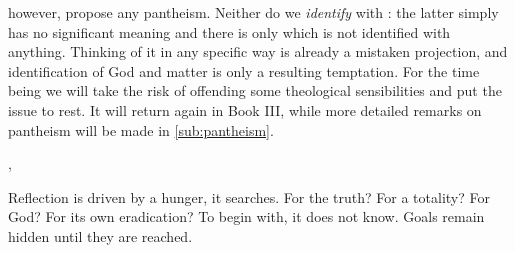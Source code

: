 however, propose any pantheism. Neither do we {\em identify}  with
: the latter simply has no significant meaning and there is only
 which is not identified with anything. Thinking of it in any
specific way is already a mistaken projection, and identification of God and
matter is only a resulting temptation.  For the time being we
will take the risk of offending some theological sensibilities and put the issue
to rest. It will return again in Book III, while more detailed remarks on
pantheism will be made in \ref{sub:pantheism}.
%


\sep


\pa Reflection is driven by a hunger, it searches. For the truth? For a totality? For 
God? For its own eradication? To begin with, 
it does not know. Goals remain hidden until they are reached.


